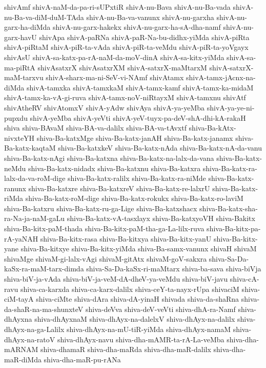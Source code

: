 {shivAmf
shivA-naM-da-pa-ri-sUPxtiR
shivA-nu-Bava
shivA-nu-Ba-vada
shivA-nu-Ba-va-diM-duM-TAda
shivA-nu-Ba-va-vanunx
shivA-nu-garxha
shivA-nu-garx-ha-diMda
shivA-nu-garx-hakekx
shivA-nu-garx-ha-sA-dha-namf
shivA-nu-garx-havU
shivApa
shivA-paRNa
shivA-paR-Na-bu-didhx-yiMda
shivA-piRta
shivA-piRtaM
shivA-piR-ta-vAda
shivA-piR-ta-veMdu
shivA-piR-ta-yoVgayx
shivAsU
shivA-sa-katx-pa-rA-naM-da-moV-dinA
shivA-sa-kitx-yiMda
shivA-sa-ma-piRtA
shivAsatxrX
shivAsatxrXM
shivA-satxrX-maMtarxM
shivA-satxrX-maM-tarxvu
shivA-sharx-ma-ni-SeV-vi-NAmf
shivAtamx
shivA-tamx-jAcnx-na-diMda
shivA-tamxka
shivA-tamxkaM
shivA-tamx-kamf
shivA-tamx-ka-midaM
shivA-tamx-ka-vA-gi-ruva
shivA-tamx-noV-niRtayxM
shivA-tamxnu
shivAtf
shivAtheRV
shivAtomxV
shivA-yAdw
shivAya
shivA-ya-yeMba
shivA-ya-ye-ni-pupxdu
shivA-yeMba
shivA-yeVti
shivA-yeV-tuyx-pa-deV-shA-dhi-kA-rakaH
shiva
shiva-BAvaM
shiva-BA-va-dalilx
shiva-BA-va-tAvxtf
shiva-Ba-kAtx-nivxteYH
shiva-Ba-katxMge
shiva-Ba-katx-janAH
shiva-Ba-katx-janamx
shiva-Ba-katx-kaqtaM
shiva-Ba-katxkeV
shiva-Ba-katx-nAda
shiva-Ba-katx-nA-da-vanu
shiva-Ba-katx-nAgi
shiva-Ba-katxna
shiva-Ba-katx-na-lalx-da-vana
shiva-Ba-katx-neMdu
shiva-Ba-katx-nidadx
shiva-Ba-katxnu
shiva-Ba-katxra
shiva-Ba-katx-ra-lalx-da-va-roM-dige
shiva-Ba-katx-ralilx
shiva-Ba-katx-ra-niMde
shiva-Ba-katx-ranunx
shiva-Ba-katxre
shiva-Ba-katxreV
shiva-Ba-katx-re-lalxrU
shiva-Ba-katx-riMda
shiva-Ba-katx-roM-dige
shiva-Ba-katx-rokukx
shiva-Ba-katx-ro-laviM
shiva-Ba-katxru
shiva-Ba-katx-ru-ga-Lige
shiva-Ba-katxshacx
shiva-Ba-katx-sha-ra-Na-ja-naM-gaLu
shiva-Ba-katx-vA-tasxlayx
shiva-Ba-katxyoVH
shiva-Bakitx
shiva-Ba-kitx-paM-thada
shiva-Ba-kitx-paM-tha-ga-La-lilx-ruva
shiva-Ba-kitx-pa-rA-yaNAH
shiva-Ba-kitx-rasa
shiva-Ba-kitxya
shiva-Ba-kitx-yanU
shiva-Ba-kitx-yane
shiva-Ba-kitxye
shiva-Ba-kitx-yiMda
shiva-Ba-samx-vanunx
shivaH
shivaM
shivaMge
shivaM-gi-lalx-vAgi
shivaM-gitAtx
shivaM-goV-sakxra
shiva-Sa-Da-kaSx-ra-maM-tarx-dimda
shiva-Sa-Da-kaSx-ri-maMtarx
shiva-ba-sava
shiva-biVja
shiva-biV-ja-vAda
shiva-biV-ja-veM-dA-dheV-ya-veMdu
shiva-biV-javu
shiva-cA-ravu
shiva-ca-karxda
shiva-ca-karx-dalilx
shiva-ceY-ta-nayx-rUpa
shivaciM
shiva-ciM-tayA
shiva-ciMte
shiva-dAra
shiva-dA-yinaH
shivada
shiva-da-shaRna
shiva-da-shaR-na-ma-shunxteV
shiva-deVva
shiva-deV-veVti
shiva-dhA-ra-Namf
shiva-dhAyxna
shiva-dhAyxnaM
shiva-dhAyx-na-dalelxV
shiva-dhAyx-na-dalilx
shiva-dhAyx-na-ga-Lalilx
shiva-dhAyx-na-mU-tiR-yiMda
shiva-dhAyx-namaM
shiva-dhAyx-na-ratoV
shiva-dhAyx-navu
shiva-dha-mAMR-ta-rA-La-veMba
shiva-dha-mARNAM
shiva-dhamaR
shiva-dha-maRda
shiva-dha-maR-dalilx
shiva-dha-maR-diMda
shiva-dha-maR-pu-rANa
}
